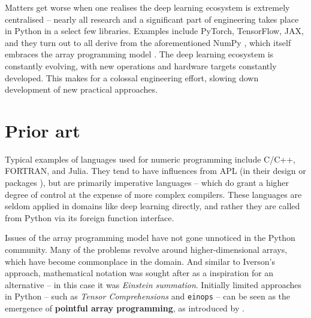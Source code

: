 Matters get worse when one realises the deep learning ecosystem is extremely centralised -- nearly all research and a significant part of engineering takes place in Python in a select few libraries. Examples include PyTorch, TensorFlow, JAX, and they turn out to all derive from the aforementioned NumPy \cite{frostig2018compiling, paszke2019pytorch, abadi2016tensorflow}, which itself embraces the array programming model \cite{harris2020array}. 
The deep learning ecosystem is constantly evolving, with new operations and hardware targets constantly developed. This makes for a colossal engineering effort, slowing down development of new practical approaches.

\section{Prior art}

Typical examples of languages used for numeric programming include C/C++, FORTRAN, and Julia. 
They tend to have influences from APL (in their design \cite{bernecky1991fortran} or packages \cite{eigenweb}), but are primarily imperative languages -- which do grant a higher degree of control at the expense of more complex compilers. 
These languages are seldom applied in domains like deep learning directly, and rather they are called from Python via its foreign function interface. 

Issues of the array programming model have not gone unnoticed in the Python community. Many of the problems revolve around higher-dimensional arrays, which have become commonplace in the domain. And similar to Iverson's approach, mathematical notation was sought after as a inspiration for an alternative -- in this case it was \textit{Einstein summation}. Initially limited approaches in Python -- such as \textit{Tensor Comprehensions} \cite{vasilache2018tensor} and \texttt{einops} \cite{rogozhnikov2021einops} -- can be seen as the emergence of \textbf{pointful array programming}, as introduced by \textcite{paszke2021getting}. 

